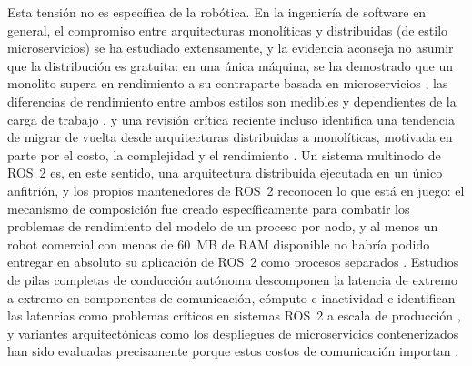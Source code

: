 Esta tensión no es específica de la robótica. En la ingeniería de software
en general, el compromiso entre arquitecturas monolíticas y distribuidas
(de estilo microservicios) se ha estudiado extensamente, y la evidencia
aconseja no asumir que la distribución es gratuita: en una única máquina, se
ha demostrado que un monolito supera en rendimiento a su contraparte basada
en microservicios \cite{blinowski2022}, las diferencias de rendimiento entre
ambos estilos son medibles y dependientes de la carga de trabajo
\cite{tapia2020}, y una revisión crítica reciente incluso identifica una
tendencia de migrar de vuelta desde arquitecturas distribuidas a monolíticas,
motivada en parte por el costo, la complejidad y el rendimiento
\cite{felisberto2024}. Un sistema multinodo de ROS~2 es, en este sentido,
una arquitectura distribuida ejecutada en un único anfitrión, y los propios
mantenedores de ROS~2 reconocen lo que está en juego: el mecanismo de
composición fue creado específicamente para combatir los problemas de
rendimiento del modelo de un proceso por nodo, y al menos un robot comercial
con menos de 60~MB de RAM disponible no habría podido entregar en absoluto
su aplicación de ROS~2 como procesos separados \cite{macenski2023}. Estudios
de pilas completas de conducción autónoma descomponen la latencia de extremo
a extremo en componentes de comunicación, cómputo e inactividad e
identifican las latencias como problemas críticos en sistemas ROS~2 a escala
de producción \cite{betz2023a}, y variantes arquitectónicas como los
despliegues de microservicios contenerizados han sido evaluadas precisamente
porque estos costos de comunicación importan \cite{betz2024}.

